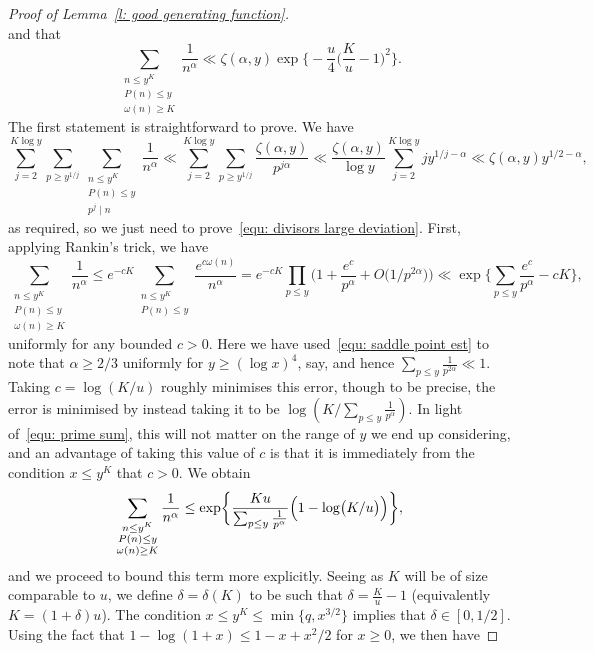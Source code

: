 \documentclass[a4paper,12pt,reqno]{amsart}
\begin{document}
\begin{proof}[Proof of Lemma~\ref{l: good generating function}]
\[\]
and that
\begin{equation}\label{equ: divisors large deviation}
\sum_{\substack{n \leq y^K \\ P(n) \leq y \\ \omega(n) \geq K}} \frac{1}{n^{\alpha}} \ll \zeta(\alpha, y) \exp \biggl\{ - \frac{u}{4} \biggl( \frac{K}{u} -1 \biggr)^2 \biggr\} .
\end{equation}
The first statement is straightforward to prove. We have
\[
\sum_{j=2}^{K \log y} \sum_{p \geq y^{1/j}} \sum_{\substack{n \leq y^K \\ P(n) \leq y \\ p^j \mid n}} \frac{1}{n^{\alpha}} \ll \sum_{j=2}^{K \log y} \sum_{p \geq y^{1/j}} \frac{\zeta(\alpha, y)}{p^{j \alpha}} \ll \frac{\zeta(\alpha, y)}{\log y} \sum_{j = 2}^{K \log y} j y^{1/j - \alpha} \ll \zeta (\alpha, y) y^{1/2 - \alpha},
\]
as required, so we just need to prove~\eqref{equ: divisors large deviation}. First, applying Rankin's trick, we have
\[
\sum_{\substack{n \leq y^K \\ P(n) \leq y \\ \omega(n) \geq K}} \frac{1}{n^{\alpha}} \leq  e^{-cK} \sum_{\substack{n \leq y^K \\ P(n) \leq y}} \frac{e^{c \omega (n)}}{n^{\alpha}} = e^{-cK} \prod_{p \leq y} \biggl( 1 + \frac{e^c}{p^{\alpha}} + O \bigl( 1/p^{2 \alpha} \bigr) \biggr) \ll \exp \biggl\{ \sum_{p \leq y} \frac{e^c}{p^{\alpha}} - cK \biggr\},
\]
uniformly for any bounded $c>0$. Here we have used~\eqref{equ: saddle point est} to note that $\alpha \geq 2/3 $ uniformly for $y \geq (\log x)^4$, say, and hence $\sum_{p \leq y} \frac{1}{p^{2\alpha}} \ll 1$. Taking $c = \log (K / u)$ roughly minimises this error, though to be precise, the error is minimised by instead taking it to be $\log ( K / \sum_{p \leq y} \frac{1}{p^{\alpha}})$. In light of~\eqref{equ: prime sum}, this will not matter on the range of $y$ we end up considering, and an advantage of taking this value of $c$ is that it is immediately from the condition $x \leq y^K$ that $c>0$. We obtain
\[
\sum_{\substack{n \leq y^K \\ P(n) \leq y \\ \omega(n) \geq K}} \frac{1}{n^{\alpha}} \leq \exp \biggl\{ \frac{K u}{\sum_{p \leq y} \frac{1}{p^{\alpha}}} \Bigl( 1 - \log \bigl( K / u \bigr) \Bigr) \biggr\},
\]
and we proceed to bound this term more explicitly. Seeing as $K$ will be of size comparable to $u$, we define $\delta = \delta (K)$ to be such that $\delta = \frac{K}{u}-1$ (equivalently $K = (1 + \delta) u$). The condition $x \leq y^K \leq \min \{ q, x^{3/2} \}$ implies that $\delta \in [0, 1/2]$. Using the fact that $1 - \log (1+x) \leq 1 - x + x^2/2$ for $x \geq 0$, we then have

\end{proof}
\end{document}
